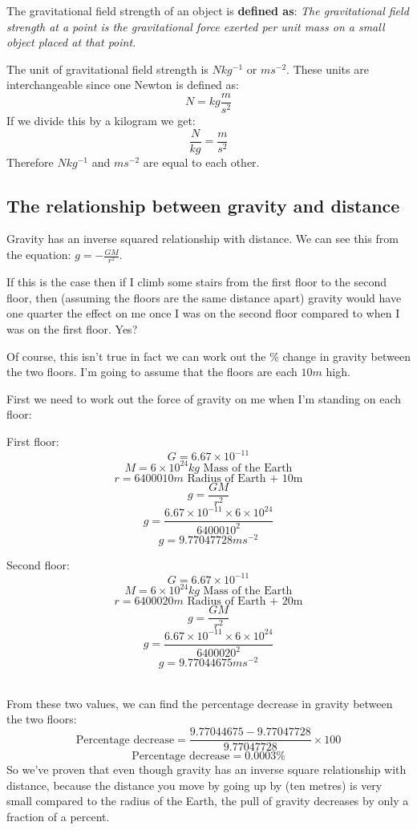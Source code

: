 \documentclass{article}
\begin{document}
The gravitational field strength of an object is \textbf{defined as}:
\textit{The gravitational field strength at a point is the gravitational force
exerted per unit mass on a small object placed at that point.}

The unit of gravitational field strength is $Nkg^{-1}$ or $ms^{-2}$. These units
are interchangeable since one Newton is defined as:
\[
	N = kg \frac{m}{s^2}
\] 
If we divide this by a kilogram we get:
\[
	\frac{N}{kg} = \frac{m}{s^2}
\]
Therefore $Nkg^{-1}$ and $ms^{-2}$ are equal to each other.


\subsection*{The relationship between gravity and distance}
Gravity has an inverse squared relationship with distance. We can see this from
the equation: $g = -\frac{GM}{r^2}$. 

If this is the case then if I climb some stairs from the first floor to the
second floor, then (assuming the floors are the same distance apart) gravity
would have one quarter the effect on me once I was on the second floor compared
to when I was on the first floor. Yes?

Of course, this isn't true in fact we can work out the \% change in gravity
between the two floors. I'm going to assume that the floors are each $10m$ high.

First we need to work out the force of gravity on me when I'm standing on each
floor:

\begin{minipage}[t]{0.5\textwidth}
First floor:
\[
	G = 6.67 \times 10^{-11}
\]
\[
	M = 6 \times 10^{24}kg \textrm{ Mass of the Earth}
\]
\[
	r = 6400010m \textrm{ Radius of Earth + 10m}
\]
\[
	g = \frac{GM}{r^2}
\]
\[
	g = \frac{6.67 \times 10^{-11} \times 6 × 10^{24}}{6400010^2}
\]
\[
	g = 9.77047728ms^{-2}
\]
\end{minipage}
\begin{minipage}[t]{0.5\textwidth}
Second floor:
\[
	G = 6.67 \times 10^{-11}
\]
\[
	M = 6 \times 10^{24}kg \textrm{ Mass of the Earth}
\]
\[
	r = 6400020m \textrm{ Radius of Earth + 20m}
\]
\[
	g = \frac{GM}{r^2}
\]
\[
	g = \frac{6.67 \times 10^{-11} \times 6 \times 10^{24}}{6400020^2}
\]
\[
	g = 9.77044675ms^{-2}
\]
\end{minipage}\\

From these two values, we can find the percentage decrease in gravity between
the two floors:
\[
	\textrm{Percentage decrease} 
	= \frac{9.77044675 - 9.77047728}{9.77047728} \times 100
\]
\[
	\textrm{Percentage decrease} = 0.0003 \%
\]
So we've proven that even though gravity has an inverse square relationship with
distance, because the distance you move by going up by (ten metres) is very
small compared to the radius of the Earth, the pull of gravity decreases by only
a fraction of a percent.
\end{document}
